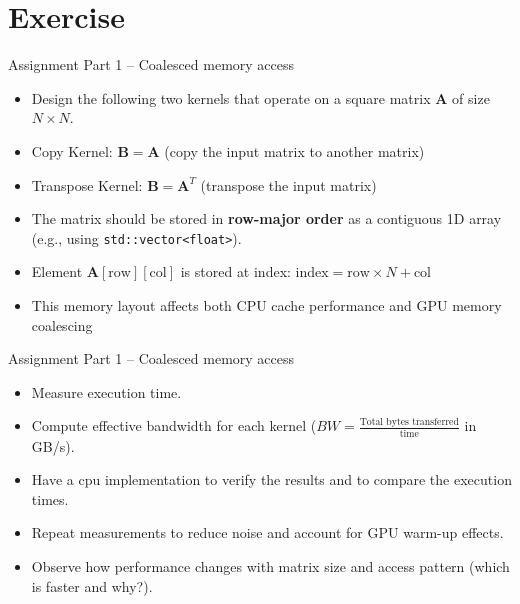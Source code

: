 \documentclass[11pt,t]{beamer}
\begin{document}
\section{Exercise}

\begin{frame}{Assignment}
Part 1 -- Coalesced memory access
\vspace{2mm}
\small{
\begin{itemize}\setlength\itemsep{0.75em}
    \item Design the following two kernels that operate on a square matrix $\mathbf{A}$ of size $N\times N$.
    \item Copy Kernel: $\mathbf{B} = \mathbf{A}$ (copy the input matrix to another matrix)
    \item Transpose Kernel: $\mathbf{B} = \mathbf{A}^T$ (transpose the input matrix)
    \item The matrix should be stored in \textbf{row-major order} as a contiguous 1D array (e.g., using \texttt{std::vector<float>}). 
    \item Element $\mathbf{A}[\text{row}][\text{col}]$ is stored at index: $\text{index} = \text{row} \times N + \text{col}$
    \item This memory layout affects both CPU cache performance and GPU memory coalescing %
    
\end{itemize}
}
\vspace{4mm}
\end{frame}

\begin{frame}{Assignment}
Part 1 -- Coalesced memory access
\vspace{2mm}
\small{
\begin{itemize}\setlength\itemsep{0.75em}
    \item Measure execution time.
    \item Compute effective bandwidth for each kernel ($BW = \frac{\text{Total bytes transferred}}{\mathrm{time}}$ in GB/s).
    \item Have a cpu implementation to verify the results and to compare the execution times.
    \item Repeat measurements to reduce noise and account for GPU warm-up effects.
    \item Observe how performance changes with matrix size and access pattern (which is faster and why?).
\end{itemize}
}
\vspace{4mm}
\end{frame}
\end{document}
